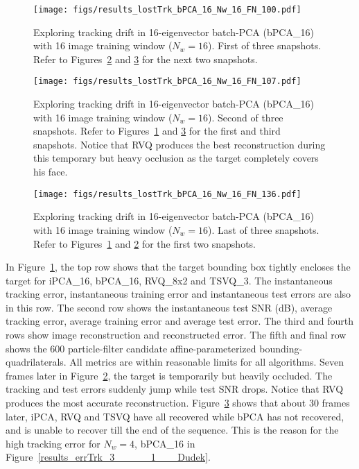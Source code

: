 \begin{figure}
\centering
\texttt{[image: figs/results\_lostTrk\_bPCA\_16\_Nw\_16\_FN\_100.pdf]}
\caption{Exploring tracking drift in 16-eigenvector batch-PCA (bPCA\_16) with 16 image training window ($N_w=16$).  First of three snapshots.  Refer to Figures~\ref{fig:results_lostTrk_bPCA_16_Nw_16_FN_107} and \ref{fig:results_lostTrk_bPCA_16_Nw_16_FN_136} for the next two snapshots.}
\label{fig:results_lostTrk_bPCA_16_Nw_16_FN_100}
\end{figure}

 
\begin{figure}
\centering
\texttt{[image: figs/results\_lostTrk\_bPCA\_16\_Nw\_16\_FN\_107.pdf]}
\caption{Exploring tracking drift in 16-eigenvector batch-PCA (bPCA\_16) with 16 image training window ($N_w=16$).  Second of three snapshots.  Refer to Figures~\ref{fig:results_lostTrk_bPCA_16_Nw_16_FN_100} and \ref{fig:results_lostTrk_bPCA_16_Nw_16_FN_136} for the first and third snapshots.  Notice that RVQ produces the best reconstruction during this temporary but heavy occlusion as the target completely covers his face.}
\label{fig:results_lostTrk_bPCA_16_Nw_16_FN_107}
\end{figure}


\begin{figure}
\centering
\texttt{[image: figs/results\_lostTrk\_bPCA\_16\_Nw\_16\_FN\_136.pdf]}
\caption{Exploring tracking drift in 16-eigenvector batch-PCA (bPCA\_16) with 16 image training window ($N_w=16$).  Last of three snapshots.  Refer to Figures~\ref{fig:results_lostTrk_bPCA_16_Nw_16_FN_100} and \ref{fig:results_lostTrk_bPCA_16_Nw_16_FN_107} for the first two snapshots.}
\label{fig:results_lostTrk_bPCA_16_Nw_16_FN_136}
\end{figure}


In Figure~\ref{fig:results_lostTrk_bPCA_16_Nw_16_FN_100}, the top row shows that the target bounding box tightly encloses the target for iPCA\_16, bPCA\_16, RVQ\_8x2 and TSVQ\_3.  The instantaneous tracking error, instantaneous training error and instantaneous test errors are also in this row.  The second row shows the instantaneous test SNR (dB), average tracking error, average training error and average test error.     The third and fourth rows show image reconstruction and reconstructed error.  The fifth and final row shows the 600 particle-filter candidate affine-parameterized bounding-quadrilaterals.  All metrics are within reasonable limits for all algorithms.  Seven frames later in Figure~\ref{fig:results_lostTrk_bPCA_16_Nw_16_FN_107}, the target is temporarily but heavily occluded.  The tracking and test errors suddenly jump while test SNR drops.  Notice that RVQ produces the most accurate reconstruction.  Figure~\ref{fig:results_lostTrk_bPCA_16_Nw_16_FN_136} shows that about 30 frames later, iPCA, RVQ and TSVQ have all recovered while bPCA has not recovered, and is unable to recover till the end of the sequence.  This is the reason for the high tracking error for $N_w=4$, bPCA\_16 in Figure~\ref{results_errTrk_3_____1___Dudek}. 



